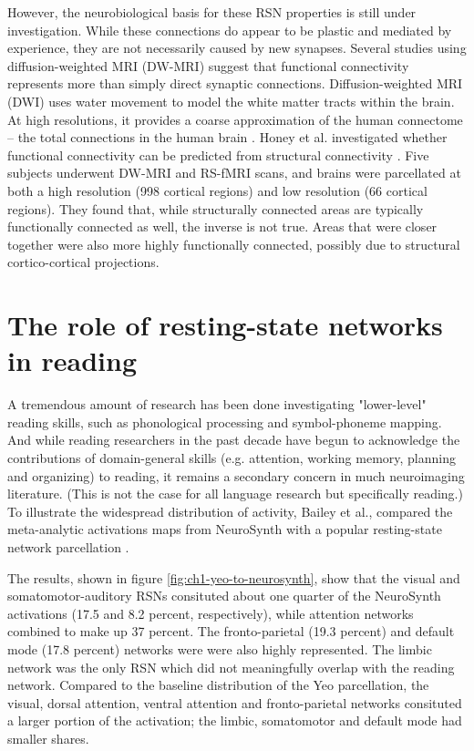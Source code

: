 However, the neurobiological basis for these RSN properties is still under investigation. While these connections do appear to be plastic and mediated by experience, they are not necessarily caused by new synapses. Several studies using diffusion-weighted MRI (DW-MRI) suggest that functional connectivity represents more than simply direct synaptic connections. Diffusion-weighted MRI (DWI) uses water movement to model the white matter tracts within the brain. At high resolutions, it provides a coarse approximation of the human connectome -- the total connections in the human brain \cite{Sporns2005}. Honey et al. investigated whether functional connectivity can be predicted from structural connectivity \cite{Honey2009}. Five subjects underwent DW-MRI and RS-fMRI scans, and brains were parcellated at both a high resolution (998 cortical regions) and low resolution (66 cortical regions). They found that, while structurally connected areas are typically functionally connected as well, the inverse is not true. Areas that were closer together were also more highly functionally connected, possibly due to structural cortico-cortical projections. 

\section{The role of resting-state networks in reading}
A tremendous amount of research has been done investigating "lower-level" reading skills, such as phonological processing and symbol-phoneme mapping. And while reading researchers in the past decade have begun to acknowledge the contributions of domain-general skills (e.g. attention, working memory, planning and organizing) to reading, it remains a secondary concern in much neuroimaging literature. (This is not the case for all language research but specifically reading.) To illustrate the widespread distribution of activity, Bailey et al., compared the meta-analytic activations maps from NeuroSynth with a popular resting-state network parcellation \cite{Bailey2018}. 

The results, shown in figure \ref{fig:ch1-yeo-to-neurosynth}, show that the visual and somatomotor-auditory RSNs consituted about one quarter of the NeuroSynth activations (17.5 and 8.2 percent, respectively), while attention networks combined to make up 37 percent. The fronto-parietal (19.3 percent) and default mode (17.8 percent) networks were were also highly represented. The limbic network was the only RSN which did not meaningfully overlap with the reading network. Compared to the baseline distribution of the Yeo parcellation, the visual, dorsal attention, ventral attention and fronto-parietal networks consituted a larger portion of the activation; the limbic, somatomotor and default mode had smaller shares. 

